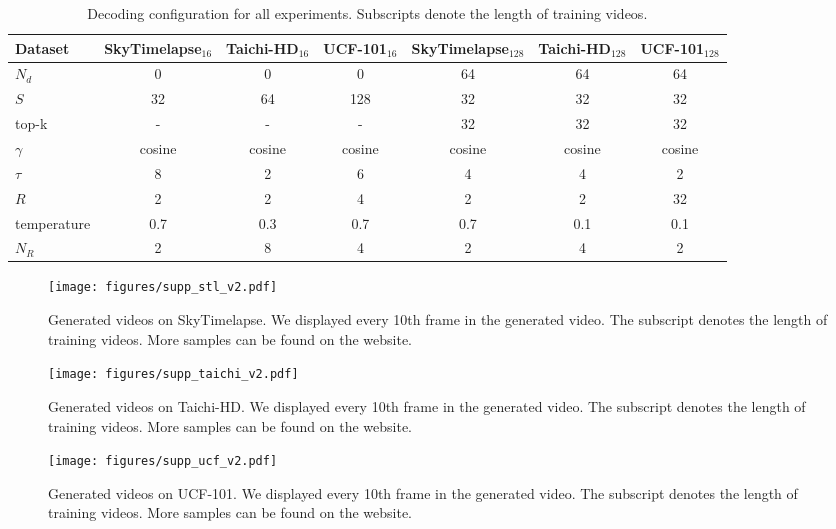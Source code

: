 \documentclass[10pt,twocolumn,letterpaper]{article}
\begin{document}
\begin{table*}[t]
    \centering
    \caption{Decoding configuration for all experiments. Subscripts denote the length of training videos.}
    \label{tab:inference_config}
    \begin{tabular}{l|cccccc}
    \toprule
    Dataset & SkyTimelapse$_{16}$ & Taichi-HD$_{16}$ & UCF-101$_{16}$ & SkyTimelapse$_{128}$ & Taichi-HD$_{128}$& UCF-101$_{128}$\\
    \midrule
    $N_d$ & 0 & 0 & 0 & 64 & 64 & 64\\
    \hline
    $S$ & 32 & 64 & 128 & 32 & 32 & 32\\
    top-k & - & - & - & 32 & 32 & 32 \\
    $\gamma$ & cosine & cosine & cosine & cosine & cosine & cosine \\
    $\tau$ & 8 & 2 & 6 & 4 & 4 & 2 \\
    \hline
    $R$  & 2 & 2 & 4 & 2 & 2 & 32 \\
    temperature  & 0.7 & 0.3 & 0.7 & 0.7 & 0.1 & 0.1 \\
    $N_R$  & 2 & 8 & 4 & 2 & 4 & 2 \\
    \bottomrule
    \end{tabular}
\end{table*}

\begin{figure*}[t]
    \centering
    \texttt{[image: figures/supp\_stl\_v2.pdf]}
    \caption{Generated videos on SkyTimelapse. We displayed every 10th frame in the generated video. The subscript denotes the length of training videos. More samples can be found on the website.}
    \label{fig:supp_stl}
\end{figure*}
\begin{figure*}[t]
    \centering
    \texttt{[image: figures/supp\_taichi\_v2.pdf]}
    \caption{Generated videos on Taichi-HD. We displayed every 10th frame in the generated video. The subscript denotes the length of training videos. More samples can be found on the website.}
    \label{fig:supp_taichi}
\end{figure*}
\begin{figure*}[t]
    \centering
    \texttt{[image: figures/supp\_ucf\_v2.pdf]}
    \caption{Generated videos on UCF-101. We displayed every 10th frame in the generated video. The subscript denotes the length of training videos. More samples can be found on the website.}
    \label{fig:supp_ucf}
\end{figure*} 
\end{document}
